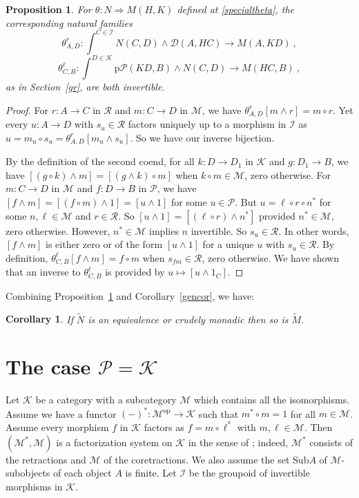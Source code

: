 \documentclass[a4paper,12pt,reqno]{amsart}
\newtheorem{proposition}[theorem]{Proposition}
\newtheorem{corollary}[theorem]{Corollary}
\theoremstyle{definition}
\theoremstyle{fact}
\theoremstyle{genquest}
\theoremstyle{step}
\newcommand{\dd}{\colon}
\newcommand{\lra}{\longrightarrow}
\newcommand{\ra}{\rightarrow}
\def\CD{{\mathscr D}}
\def\CI{{\mathscr I}}
\def\CK{{\mathscr K}}
\def\CM{{\mathscr M}}
\def\CP{{\mathscr P}}
\def\CR{{\mathscr R}}
\begin{document}
\begin{proposition}\label{twocoends}
For $\theta \dd N \Rightarrow M(H,K)$ defined at \eqref{specialtheta}, 
the corresponding natural families
$$\theta^r_{A,D} \dd \int^{C\in \CI}{N(C,D)\wedge \CD(A,HC)} \lra M(A,KD) \ ,$$
$$\theta^{\ell}_{C,B} \dd \int^{D\in \CK}{\mathrm{p}\CP(KD,B)\wedge N(C,D)} \lra M(HC,B) \ ,$$
as in Section~\ref{gr}, are both invertible. 
\end{proposition}
\begin{proof}
For $r\dd A\ra C$ in $\CR$ and $m\dd C\ra D$ in $\CM$, 
we have $\theta^r_{A,D}[m\wedge r]= m\circ r$. 
Yet every $u\dd A\ra D$ with $s_u\in \CR$ factors uniquely up
to a morphism in $\CI$ as $u=m_u\circ s_u = \theta^r_{A,D}[m_u\wedge s_u]$.
So we have our inverse bijection.

By the definition of the second coend, for all $k\dd D\ra D_1$ in $\CK$ and 
$g\dd D_1\ra B$, we have $[(g\circ k)\wedge m] = [(g\wedge k)\circ m]$
when $k\circ m \in \CM$, zero otherwise.
For $m\dd C\ra D$ in $\CM$ and $f\dd D\ra B$ in $\CP$, we have
$[f\wedge m] = [(f\circ m)\wedge 1] = [u\wedge 1]$ for some $u \in \CP$.
But $u = \ell \circ r \circ n^*$ for some $n,\ell \in \CM$ and $r\in \CR$.
So $[u\wedge 1] = [(\ell \circ r)\wedge n^*]$ provided $n^*\in \CM$, zero
otherwise. However, $n^*\in \CM$ implies $n$ invertible. 
So $s_u\in \CR$. In other words, $[f\wedge m]$ is either zero or of the
form $[u\wedge 1]$ for a unique $u$ with $s_u\in \CR$.  
By definition, $\theta^{\ell}_{C,B}[f\wedge m]= f\circ m$ when $s_{fm}\in \CR$,
zero otherwise. 
We have shown that an inverse to $\theta^{\ell}_{C,B}$ is provided by 
$u \mapsto [u\wedge 1_C]$.
\end{proof}

Combining Proposition~\ref{twocoends} and Corollary~\ref{gencor}, we have:
 
\begin{corollary}\label{NgivesM}
If $\widetilde{N}$ is an equivalence or crudely monadic then so is $\widetilde{M}$.
\end{corollary}

\section{The case $\CP = \CK$}\label{tpmc}

Let $\CK$ be a category with a subcategory $\CM$ which contains all the isomorphisms. 
Assume we have a functor $(-)^* \dd \CM^\mathrm{op} \ra \CK$ such that
$m^*\circ m = 1$ for all $m\in \CM$.
Assume every morphism $f$ in $\CK$ factors as $f = m\circ \ell^*$ with
$m, \ell \in \CM$. 
Then $(\CM^*,\CM)$ is a factorization system on $\CK$ in the sense of
\cite{FreydKelly}; indeed, $\CM^*$ consists of the retractions and $\CM$ of the coretractions.
We also assume the set $\mathrm{Sub}A$ of $\CM$-subobjects of each
object $A$ is finite. Let $\CI$ be the groupoid of invertible morphisms in $\CK$.
  
\end{document}
